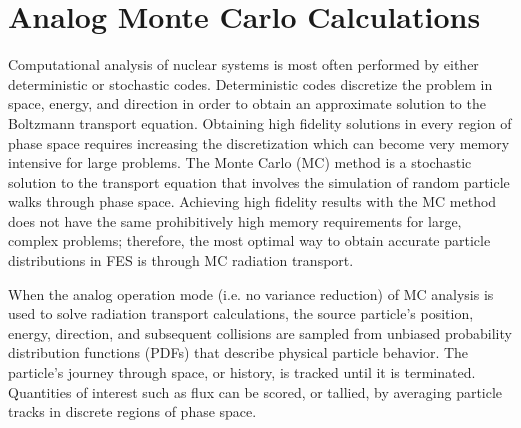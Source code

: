 


\section{Analog Monte Carlo Calculations} \label{sec:analog_mc}
Computational analysis of nuclear systems is most often performed by either
deterministic or stochastic codes.  Deterministic codes discretize the problem
in space, energy, and direction in order to obtain an approximate solution to
the Boltzmann transport equation.  Obtaining high fidelity solutions in every
region of phase space requires increasing the discretization which can
become very memory intensive for large problems. 
The Monte Carlo (MC) method is a stochastic solution to the transport equation \cite{l_m}
that involves the simulation of random particle
walks through phase space.  Achieving high fidelity results with the MC method
does not have the same prohibitively high memory requirements for large,
complex problems; therefore,
the most optimal way to 
obtain accurate particle distributions in FES is through MC radiation transport.


When the analog operation mode (i.e. no variance reduction) of MC analysis is 
used to solve radiation transport calculations, 
the source particle's position, energy, direction,
and subsequent collisions are sampled from unbiased probability
distribution functions (PDFs) that describe physical particle behavior.
The particle's journey through space, or history, is tracked until it is
terminated.
Quantities of interest such as flux can be
scored, or tallied, by averaging particle tracks
in discrete regions of phase space.

